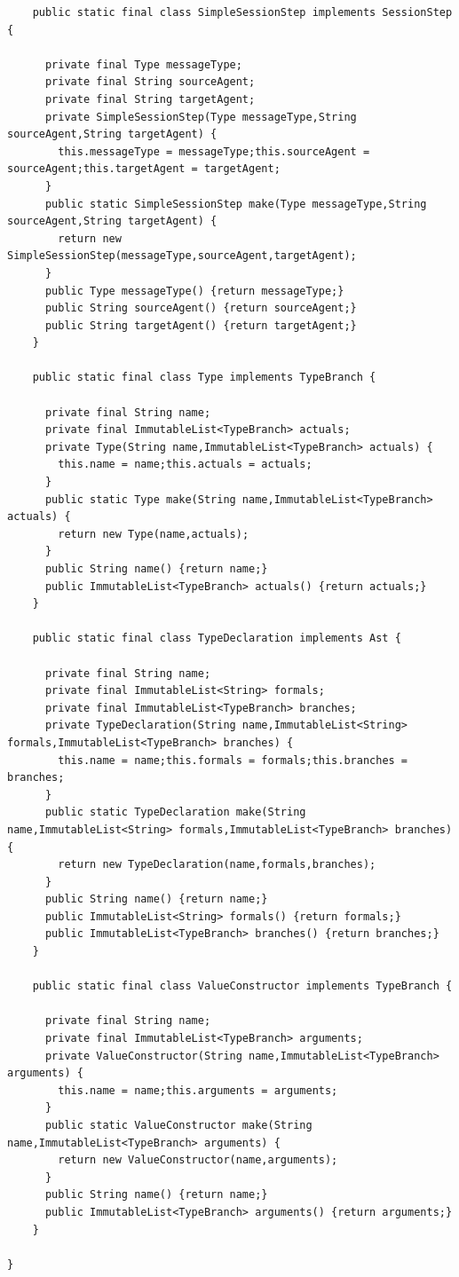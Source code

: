 \documentclass[a4paper,12pt,oneside,fleqn]{book} %
\begin{document}
{\begin{verbatim}
    public static final class SimpleSessionStep implements SessionStep {
      
      private final Type messageType;
      private final String sourceAgent;
      private final String targetAgent;
      private SimpleSessionStep(Type messageType,String sourceAgent,String targetAgent) {
        this.messageType = messageType;this.sourceAgent = sourceAgent;this.targetAgent = targetAgent;
      }
      public static SimpleSessionStep make(Type messageType,String sourceAgent,String targetAgent) {
        return new SimpleSessionStep(messageType,sourceAgent,targetAgent);
      }
      public Type messageType() {return messageType;}
      public String sourceAgent() {return sourceAgent;}
      public String targetAgent() {return targetAgent;}
    }
  
    public static final class Type implements TypeBranch {
      
      private final String name;
      private final ImmutableList<TypeBranch> actuals;
      private Type(String name,ImmutableList<TypeBranch> actuals) {
        this.name = name;this.actuals = actuals;
      }
      public static Type make(String name,ImmutableList<TypeBranch> actuals) {
        return new Type(name,actuals);
      }
      public String name() {return name;}
      public ImmutableList<TypeBranch> actuals() {return actuals;}
    }
  
    public static final class TypeDeclaration implements Ast {
      
      private final String name;
      private final ImmutableList<String> formals;
      private final ImmutableList<TypeBranch> branches;
      private TypeDeclaration(String name,ImmutableList<String> formals,ImmutableList<TypeBranch> branches) {
        this.name = name;this.formals = formals;this.branches = branches;
      }
      public static TypeDeclaration make(String name,ImmutableList<String> formals,ImmutableList<TypeBranch> branches) {
        return new TypeDeclaration(name,formals,branches);
      }
      public String name() {return name;}
      public ImmutableList<String> formals() {return formals;}
      public ImmutableList<TypeBranch> branches() {return branches;}
    }
  
    public static final class ValueConstructor implements TypeBranch {
      
      private final String name;
      private final ImmutableList<TypeBranch> arguments;
      private ValueConstructor(String name,ImmutableList<TypeBranch> arguments) {
        this.name = name;this.arguments = arguments;
      }
      public static ValueConstructor make(String name,ImmutableList<TypeBranch> arguments) {
        return new ValueConstructor(name,arguments);
      }
      public String name() {return name;}
      public ImmutableList<TypeBranch> arguments() {return arguments;}
    }
  
}
\end{verbatim}

} %
\end{document}
